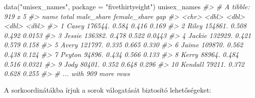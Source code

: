 \documentclass[
]{book}
\newenvironment{Shaded}{\begin{snugshade}}{\end{snugshade}}
\newcommand{\AttributeTok}[1]{\textcolor[rgb]{0.77,0.63,0.00}{#1}}
\newcommand{\CommentTok}[1]{\textcolor[rgb]{0.56,0.35,0.01}{\textit{#1}}}
\newcommand{\FunctionTok}[1]{\textcolor[rgb]{0.00,0.00,0.00}{#1}}
\newcommand{\NormalTok}[1]{#1}
\newcommand{\StringTok}[1]{\textcolor[rgb]{0.31,0.60,0.02}{#1}}
\begin{document}
\begin{Shaded}
\begin{Highlighting}[]
\FunctionTok{data}\NormalTok{(}\StringTok{"unisex\_names"}\NormalTok{, }\AttributeTok{package =} \StringTok{"fivethirtyeight"}\NormalTok{)}
\NormalTok{unisex\_names}
\CommentTok{\#\textgreater{} \# A tibble: 919 x 5}
\CommentTok{\#\textgreater{}    name      total male\_share female\_share    gap}
\CommentTok{\#\textgreater{}    \textless{}chr\textgreater{}     \textless{}dbl\textgreater{}      \textless{}dbl\textgreater{}        \textless{}dbl\textgreater{}  \textless{}dbl\textgreater{}}
\CommentTok{\#\textgreater{}  1 Casey   176544.      0.584        0.416 0.169 }
\CommentTok{\#\textgreater{}  2 Riley   154861.      0.508        0.492 0.0153}
\CommentTok{\#\textgreater{}  3 Jessie  136382.      0.478        0.522 0.0443}
\CommentTok{\#\textgreater{}  4 Jackie  132929.      0.421        0.579 0.158 }
\CommentTok{\#\textgreater{}  5 Avery   121797.      0.335        0.665 0.330 }
\CommentTok{\#\textgreater{}  6 Jaime   109870.      0.562        0.438 0.124 }
\CommentTok{\#\textgreater{}  7 Peyton   94896.      0.434        0.566 0.133 }
\CommentTok{\#\textgreater{}  8 Kerry    88964.      0.484        0.516 0.0321}
\CommentTok{\#\textgreater{}  9 Jody     80401.      0.352        0.648 0.296 }
\CommentTok{\#\textgreater{} 10 Kendall  79211.      0.372        0.628 0.255 }
\CommentTok{\#\textgreater{} \# ... with 909 more rows}
\end{Highlighting}
\end{Shaded}

A sorkoordinátákba írjuk a sorok válogatását biztosító lehetőségeket:
\end{document}
